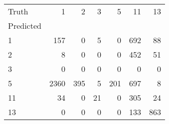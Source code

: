 \begin{tabular}{lrrrrrr}
\toprule
Truth & 1 & 2 & 3 & 5 & 11 & 13 \\
Predicted &  &  &  &  &  &  \\
\midrule
1 & 157 & 0 & 5 & 0 & 692 & 88 \\
2 & 8 & 0 & 0 & 0 & 452 & 51 \\
3 & 0 & 0 & 0 & 0 & 0 & 0 \\
5 & 2360 & 395 & 5 & 201 & 697 & 8 \\
11 & 34 & 0 & 21 & 0 & 305 & 24 \\
13 & 0 & 0 & 0 & 0 & 133 & 863 \\
\bottomrule
\end{tabular}
